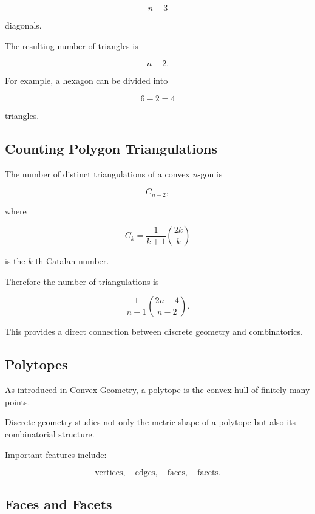 \[
\boxed{
n-3
}
\]

diagonals.

The resulting number of triangles is

\[
\boxed{
n-2.
}
\]

For example, a hexagon can be divided into

\[
6-2=4
\]

triangles.

\subsection{Counting Polygon Triangulations}
\label{subsec:counting-polygon-triangulations}

The number of distinct triangulations of a convex \(n\)-gon is

\[
\boxed{
C_{n-2},
}
\]

where

\[
C_k
=
\frac{1}{k+1}\binom{2k}{k}
\]

is the \(k\)-th Catalan number.

Therefore the number of triangulations is

\[
\boxed{
\frac{1}{n-1}
\binom{2n-4}{n-2}.
}
\]

This provides a direct connection between discrete geometry and
combinatorics.

\subsection{Polytopes}
\label{subsec:discrete-polytopes}

As introduced in Convex Geometry, a polytope is the convex hull of finitely
many points.

Discrete geometry studies not only the metric shape of a polytope but also
its combinatorial structure.

Important features include:

\[
\boxed{
\text{vertices},
\quad
\text{edges},
\quad
\text{faces},
\quad
\text{facets}.
}
\]

\subsection{Faces and Facets}
\label{subsec:faces-and-facets}

